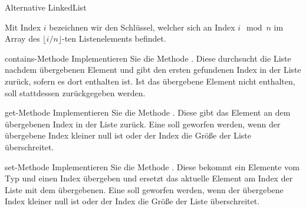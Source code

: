\documentclass{../tuda-exercise}
\begin{document}
\begin{task}{Alternative LinkedList}
    \begin{note}[title=Hinweis:, color=tuda-orange]
      Mit Index \(i\) bezeichnen wir den Schlüssel, welcher sich an Index \(i \mod n\) im Array
      des \(\lfloor i / n\rfloor\)-ten Listenelements befindet.
    \end{note}

    \begin{subtask*}[credit=\stars{1}{3}]{contains-Methode}
      Implementieren Sie die Methode . Diese durchsucht die Liste
      nachdem übergebenen Element  und gibt den ersten gefundenen Index in der
      Liste zurück, sofern es dort enthalten ist. Ist das übergebene Element nicht enthalten,
      soll stattdessen  zurückgegeben werden.

      \begin{solution}
        
      \end{solution}
    \end{subtask*}

    \clearpagesolution

    \begin{subtask*}[credit=\stars{1}{3}]{get-Methode}
      Implementieren Sie die Methode . Diese gibt das Element an dem
      übergebenen Index in der Liste zurück. Eine  soll
      geworfen werden, wenn der übergebene Index kleiner null ist oder der Index die Größe der
      Liste überschreitet.

      \begin{solution}
        
      \end{solution}
    \end{subtask*}

    \clearpagesolution

    \begin{subtask*}[credit=\stars{2}{3}]{set-Methode}
      Implementieren Sie die Methode . Diese bekommt ein
      Elemente vom Typ  und einen Index  übergeben und ersetzt das
      aktuelle Element am Index der Liste mit dem übergebenen. Eine
       soll geworfen werden, wenn der übergebene Index
      kleiner null ist oder der Index die Größe der Liste überschreitet.

      \begin{solution}
        
      \end{solution}
    \end{subtask*}


\end{task}
\end{document}
